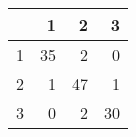 \begin{tabular}{rrrr}
  \hline
 & 1 & 2 & 3 \\ 
  \hline
1 &  35 &   2 &   0 \\ 
  2 &   1 &  47 &   1 \\ 
  3 &   0 &   2 &  30 \\ 
   \hline
\end{tabular}
